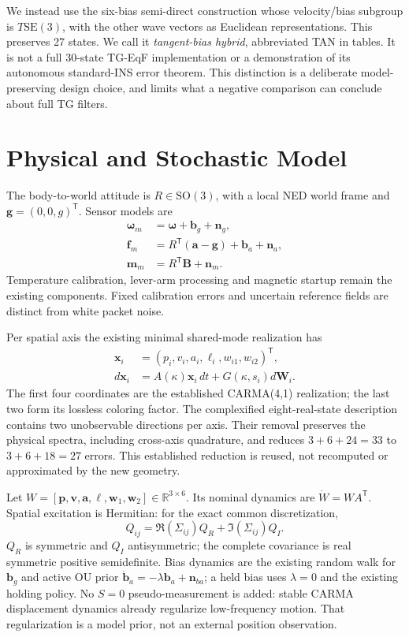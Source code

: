 \documentclass[conference]{IEEEtran}
\newcommand{\R}{\mathbb R}
\newcommand{\vc}[1]{\bm{#1}}
\newcommand{\tr}{^{\mathsf T}}
\begin{document}
We instead use the six-bias semi-direct construction whose velocity/bias
subgroup is $T\mathrm{SE}(3)$, with the other wave vectors as Euclidean
representations. This preserves 27 states. We call it \emph{tangent-bias
hybrid}, abbreviated TAN in tables. It is not a full 30-state TG-EqF
implementation or a demonstration of its autonomous standard-INS error
theorem. This distinction is a deliberate model-preserving design choice,
and limits what a negative comparison can conclude about full TG filters.

\section{Physical and Stochastic Model}
The body-to-world attitude is $R\in\mathrm{SO}(3)$, with a local NED world
frame and $\vc g=(0,0,g)\tr$. Sensor models are
\begin{align}
 \vc\omega_m&=\vc\omega+\vc b_g+\vc n_g,\\
 \vc f_m&=R\tr(\vc a-\vc g)+\vc b_a+\vc n_a,\label{eq:force}\\
 \vc m_m&=R\tr\vc B+\vc n_m.\label{eq:mag}
\end{align}
Temperature calibration, lever-arm processing and magnetic startup remain
the existing components. Fixed calibration errors and uncertain reference
fields are distinct from white packet noise.

Per spatial axis the existing minimal shared-mode realization has
\begin{equation}
 \begin{aligned}
 \vc x_i&=(p_i,v_i,a_i,\ell_i,w_{i1},w_{i2})\tr,\\
 d\vc x_i&=A(\kappa)\vc x_i\,dt+G(\kappa,s_i)d\vc W_i.
 \end{aligned}
\end{equation}
The first four coordinates are the established CARMA(4,1) realization; the
last two form its lossless coloring factor. The complexified eight-real-state
description contains two unobservable directions per axis. Their removal
preserves the physical spectra, including cross-axis quadrature, and reduces
$3+6+24=33$ to $3+6+18=27$ errors. This established reduction is reused,
not recomputed or approximated by the new geometry.

Let $W=[\vc p,\vc v,\vc a,\vc\ell,\vc w_1,\vc w_2]\in\R^{3\times6}$.
Its nominal dynamics are $\dot W=WA\tr$. Spatial excitation is Hermitian:
for the exact common discretization,
\begin{equation}
 Q_{ij}=\Re(\Sigma_{ij})Q_R+\Im(\Sigma_{ij})Q_I.
\end{equation}
$Q_R$ is symmetric and $Q_I$ antisymmetric; the complete covariance is
real symmetric positive semidefinite. Bias dynamics are the existing random
walk for $\vc b_g$ and active OU prior
$\dot{\vc b}_a=-\lambda\vc b_a+\vc n_{ba}$; a held bias uses $\lambda=0$
and the existing holding policy. No $S=0$ pseudo-measurement is added:
stable CARMA displacement dynamics already regularize low-frequency motion.
That regularization is a model prior, not an external position observation.
\end{document}
